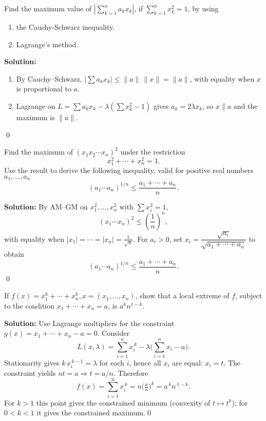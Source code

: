 \begin{problembox}
Find the maximum value of \(| \sum_{k=1}^n a_k x_k |\), if \(\sum_{k=1}^n x_k^2 = 1\), by using 
\begin{enumerate}[label=(\alph*)]
    \item the Cauchy-Schwarz inequality.
    \item Lagrange's method.
\end{enumerate}
\end{problembox}

\bigskip\noindent\textbf{Solution:}
\begin{enumerate}[label=(\alph*)]
    \item By Cauchy--Schwarz, $\big|\sum a_k x_k\big|\le \|a\|\,\|x\|=\|a\|$, with equality when $x$ is proportional to $a$.
    \item Lagrange on $L=\sum a_k x_k-\lambda(\sum x_k^2-1)$ gives $a_k=2\lambda x_k$, so $x\parallel a$ and the maximum is $\|a\|$.
\end{enumerate}\qed


\begin{problembox}
Find the maximum of \((x_1 x_2 \cdots x_n)^2\) under the restriction
\[ x_1^2 + \cdots + x_n^2 = 1. \]
Use the result to derive the following inequality, valid for positive real numbers \(a_1, \ldots, a_n\)
\[ (a_1 \cdots a_n)^{1/n} \leq \frac{a_1 + \cdots + a_n}{n}. \]
\end{problembox}

\bigskip\noindent\textbf{Solution:}
By AM--GM on $x_1^2,\dots,x_n^2$ with $\sum x_i^2=1$,
\[(x_1\cdots x_n)^2\le \left(\frac{1}{n}\right)^n,\]
with equality when $|x_1|=\cdots=|x_n|=\tfrac{1}{\sqrt n}$. For $a_i>0$, set $x_i=\dfrac{\sqrt{a_i}}{\sqrt{a_1+\cdots+a_n}}$ to obtain
\[(a_1\cdots a_n)^{1/n}\le \frac{a_1+\cdots+a_n}{n}.
\]\qed


\begin{problembox}
If \(f(x) = x_1^k + \cdots + x_n^k, x = (x_1, \ldots, x_n)\), show that a local extreme of \(f\), subject to the condition \(x_1 + \cdots + x_n = a\), is \(a^k n^{1-k}\).
\end{problembox}

\bigskip\noindent\textbf{Solution:}
Use Lagrange multipliers for the constraint \(g(x)=x_1+\cdots+x_n-a=0\). Consider
\[L(x,\lambda)=\sum_{i=1}^n x_i^{\,k}-\lambda\Big(\sum_{i=1}^n x_i-a\Big).\]
Stationarity gives \(k\,x_i^{\,k-1}=\lambda\) for each \(i\), hence all \(x_i\) are equal: \(x_i=t\). The constraint yields \(nt=a\Rightarrow t=a/n\). Therefore
\[f(x)=\sum_{i=1}^n x_i^{\,k}=n\Big(\tfrac{a}{n}\Big)^{\!k}=a^{\,k}n^{\,1-k}.
\]
For \(k>1\) this point gives the constrained minimum (convexity of \(t\mapsto t^{k}\)); for \(0<k<1\) it gives the constrained maximum.\qed


